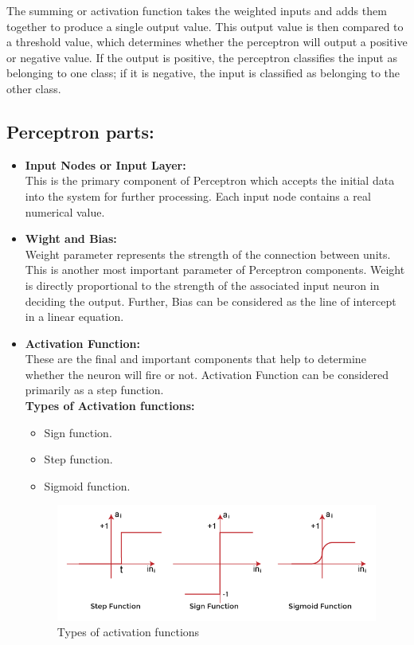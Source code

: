 \documentclass[12pt]{article}
\begin{document}
The summing or activation function takes the weighted inputs and adds them together to produce a
single output
value. This output value is then compared to a threshold value, which determines whether the
perceptron will output a positive or negative value. If the output is positive, the perceptron
classifies the input as belonging to one class; if it is negative, the input is classified as
belonging to the other class.
\subsection{Perceptron parts:}
\begin{itemize}
\item \textbf{Input Nodes or Input Layer:} \\
  This is the primary component of Perceptron which accepts the initial data into the system for
  further processing. Each input node contains a real numerical value.
\item \textbf{Wight and Bias:} \\
  Weight parameter represents the strength of the connection between units. This is another most
  important parameter of Perceptron components. Weight is directly proportional to the strength of the
  associated input neuron in deciding the output. Further, Bias can be considered as the line of
  intercept in a linear equation.
\item \textbf{Activation Function:} \\
  These are the final and important components that help to determine whether the neuron will
  fire or not. Activation Function can be considered primarily as a step function.\\
  \textbf{Types of Activation functions:}
  \begin{itemize}
  \item Sign function.
  \item Step function.
  \item Sigmoid function.
  \end{itemize}
  \begin{figure}[h]
    \centering
    \includegraphics[scale = 0.5]{funcs.png}
    \caption{Types of activation functions}
  \end{figure}
\end{itemize}
\end{document}
